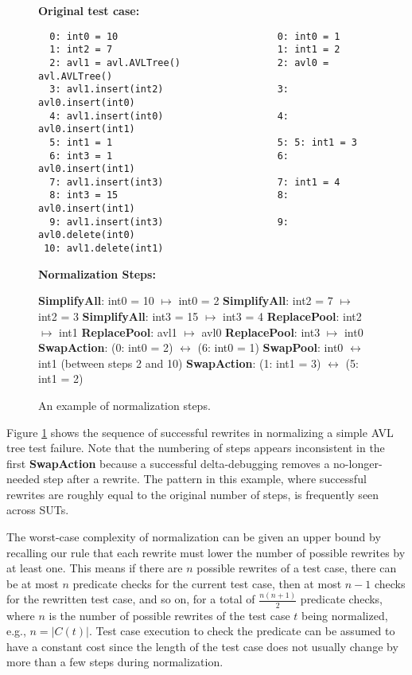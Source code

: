 \begin{figure}
{\scriptsize
{\bf Original test case:}\hspace{0.83in}{\bf Normalized:}
\begin{verbatim}
  0: int0 = 10                            0: int0 = 1
  1: int2 = 7                             1: int1 = 2
  2: avl1 = avl.AVLTree()                 2: avl0 = avl.AVLTree()
  3: avl1.insert(int2)                    3: avl0.insert(int0) 
  4: avl1.insert(int0)                    4: avl0.insert(int1) 
  5: int1 = 1                             5: 5: int1 = 3
  6: int3 = 1                             6: avl0.insert(int1) 
  7: avl1.insert(int3)                    7: int1 = 4
  8: int3 = 15                            8: avl0.insert(int1)
  9: avl1.insert(int3)                    9: avl0.delete(int0)
 10: avl1.delete(int1) 
\end{verbatim}
{\bf Normalization Steps:}
\begin{code}
{\bf SimplifyAll}: int0 = 10 $\mapsto$ int0 = 2 
{\bf SimplifyAll}: int2 = 7  $\mapsto$ int2 = 3 
{\bf SimplifyAll}: int3 = 15  $\mapsto$ int3 = 4 
{\bf ReplacePool}: int2 $\mapsto$ int1
{\bf ReplacePool}: avl1 $\mapsto$ avl0
{\bf ReplacePool}: int3 $\mapsto$ int0
{\bf SwapAction}: (0: int0 = 2)  $\leftrightarrow$ (6: int0 = 1)
{\bf SwapPool}: int0 $\leftrightarrow$ int1 (between steps 2 and 10)
{\bf SwapAction}: (1: int1 = 3)  $\leftrightarrow$ (5: int1 = 2)
\end{code}
}
\caption{An example of normalization steps.}
\label{diffnorm}
\end{figure}

Figure \ref{diffnorm} shows the sequence of successful rewrites in
normalizing a simple AVL tree test failure.  Note that the numbering
of steps appears inconsistent in the first {\bf SwapAction} because a
successful delta-debugging removes a no-longer-needed step after a
rewrite.  The pattern in this example, where successful rewrites
are roughly equal to the original number of steps, is frequently seen across SUTs.

The worst-case complexity of normalization can be given an upper bound by recalling our
rule that each rewrite must lower the number of possible rewrites by
at least one.  This means if there are $n$ possible rewrites of a
test case, there can be at most $n$ predicate checks for the current test case,
then at most $n-1$ checks for the rewritten test case, and so on, for
a total of $\frac{n(n+1)}{2}$ predicate checks, where $n$ is the
number of possible rewrites of the test case $t$ being normalized, e.g.,
$n = |C(t)|$.  Test case execution to check the predicate can be
assumed to have a constant cost since the length of the test case does
not usually change by more than a few steps during normalization. 

